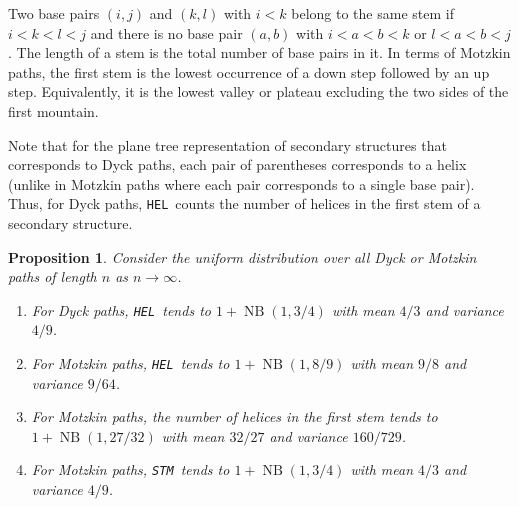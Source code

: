\documentclass{article}
\DeclareMathOperator{\NB}{NB}
\newtheorem{proposition}[theorem]{Proposition}
\newcommand{\FirstHelix}{{\tt HEL}}
\newcommand{\HEL}{{\tt HEL}}
\newcommand{\STM}{{\tt STM}}
\begin{document}
Two base pairs $(i,j)$ and $(k,l)$ with $i < k$ belong to the same stem if
$i < k < l < j$ and there is no base pair $(a,b)$ with $i < a < b < k$ 
or $l < a < b < j$.  The length of a stem is the total number of base pairs in it.  In terms of Motzkin paths, the first stem is the lowest occurrence of a down step followed by an up step.  Equivalently, it is the lowest valley or plateau excluding the two sides of the first mountain. 

Note that for the plane tree representation of secondary structures that corresponds to Dyck paths, each pair of parentheses corresponds to a helix (unlike in Motzkin paths where each pair corresponds to a single base pair).  Thus, for Dyck paths, \HEL\ counts the number of helices in the first stem of a secondary structure.

\begin{proposition} \label{prop:DyckMotzkinDepth}
Consider the uniform distribution over all Dyck or Motzkin paths of length $n$ as $n \to \infty$.
\begin{enumerate}
    \item For Dyck paths, \FirstHelix\ tends to $1 + \NB(1, 3/4)$ with mean $4/3$ and variance $4/9$.
    \item For Motzkin paths, \FirstHelix\ tends to $1 + \NB(1, 8/9)$ with mean $9/8$ and variance $9/64$.
    \item For Motzkin paths, the number of helices in the first stem tends to $1 + \NB(1, 27/32)$ with mean $32/27$ and variance $160/729$.
    \item For Motzkin paths, \STM\ tends to $1 + \NB(1, 3/4)$ with mean $4/3$ and variance $4/9$.
\end{enumerate}
\end{proposition}
\end{document}
